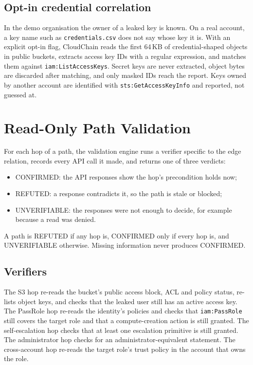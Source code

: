 \documentclass[conference]{IEEEtran}
\begin{document}
\subsection{Opt-in credential correlation}
In the demo organisation the owner of a leaked key is known. On a real account, a key name such as \texttt{credentials.csv} does not say whose key it is. With an explicit opt-in flag, CloudChain reads the first 64\,KB of credential-shaped objects in public buckets, extracts access key IDs with a regular expression, and matches them against \texttt{iam:ListAccessKeys}. Secret keys are never extracted, object bytes are discarded after matching, and only masked IDs reach the report. Keys owned by another account are identified with \texttt{sts:GetAccessKeyInfo} and reported, not guessed at.

\section{Read-Only Path Validation}\label{sec:validation}

For each hop of a path, the validation engine runs a verifier specific to the edge relation, records every API call it made, and returns one of three verdicts:
\begin{itemize}
\item CONFIRMED: the API responses show the hop's precondition holds now;
\item REFUTED: a response contradicts it, so the path is stale or blocked;
\item UNVERIFIABLE: the responses were not enough to decide, for example because a read was denied.
\end{itemize}
A path is REFUTED if any hop is, CONFIRMED only if every hop is, and UNVERIFIABLE otherwise. Missing information never produces CONFIRMED.

\subsection{Verifiers}
The S3 hop re-reads the bucket's public access block, ACL and policy status, re-lists object keys, and checks that the leaked user still has an active access key. The PassRole hop re-reads the identity's policies and checks that \texttt{iam:PassRole} still covers the target role and that a compute-creation action is still granted. The self-escalation hop checks that at least one escalation primitive is still granted. The administrator hop checks for an administrator-equivalent statement. The cross-account hop re-reads the target role's trust policy in the account that owns the role.
\end{document}
